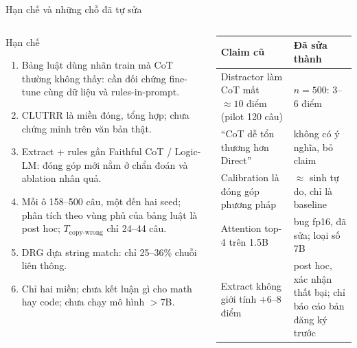 \documentclass[aspectratio=169,t]{beamer}
\begin{document}
\begin{frame}[shrink]{Hạn chế và những chỗ đã tự sửa}
\begin{columns}[T,onlytextwidth]
\begin{block}{Hạn chế}
\scriptsize
\begin{enumerate}
  \setlength{\itemsep}{2pt}
  \item Bảng luật dùng nhãn train mà CoT thường không thấy: cần đối chứng fine-tune cùng dữ liệu và rules-in-prompt.
  \item CLUTRR là miền đóng, tổng hợp; chưa chứng minh trên văn bản thật.
  \item Extract + rules gần Faithful CoT / Logic-LM: đóng góp mới nằm ở chẩn đoán và ablation nhân quả.
  \item Mỗi ô 158--500 câu, một đến hai seed; phân tích theo vùng phủ của bảng luật là post hoc; $T_{\text{copy-wrong}}$ chỉ 24--44 câu.
  \item DRG dựa string match: chỉ 25--36\% chuỗi liên thông.
  \item Chỉ hai miền; chưa kết luận gì cho math hay code; chưa chạy mô hình $>$7B.
\end{enumerate}
\end{block}
\scriptsize
\renewcommand{\arraystretch}{1.1}
\begin{tabularx}{\linewidth}{@{}YY@{}}
\toprule
\textbf{Claim cũ} & \textbf{Đã sửa thành}\\
\midrule
Distractor làm CoT mất $\approx10$ điểm (pilot 120 câu) & $n=500$: 3--6 điểm\\
``CoT dễ tổn thương hơn Direct'' & không có ý nghĩa, bỏ claim\\
Calibration là đóng góp phương pháp & $\approx$ sinh tự do, chỉ là baseline\\
Attention top-4 trên 1.5B & bug fp16, đã sửa; loại số 7B\\
Extract không giới tính $+6$--8 điểm & post hoc, xác nhận thất bại; chỉ báo cáo bản đăng ký trước\\
\bottomrule
\end{tabularx}
\end{columns}
\par\kern0pt
\end{frame}
\end{document}
